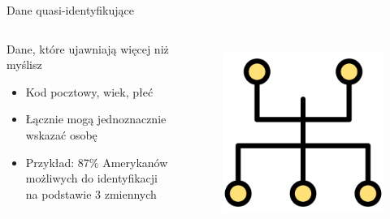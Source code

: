   \begin{frame}{Dane quasi-identyfikujące}
  \begin{columns}[c]
      \begin{alertblock}{Dane, które ujawniają więcej niż myślisz}
        \begin{itemize}
          \item Kod pocztowy, wiek, płeć
          \item Łącznie mogą jednoznacznie wskazać osobę
          \item Przykład: 87\% Amerykanów możliwych do identyfikacji na podstawie 3 zmiennych
        \end{itemize}
      \end{alertblock}
      \begin{figure}
        \centering
        \includegraphics[height=0.45\textheight]{images/network-topology.png}
        \label{fig:quasiIdentifiers}
      \end{figure}
  \end{columns}
  \end{frame}
  
